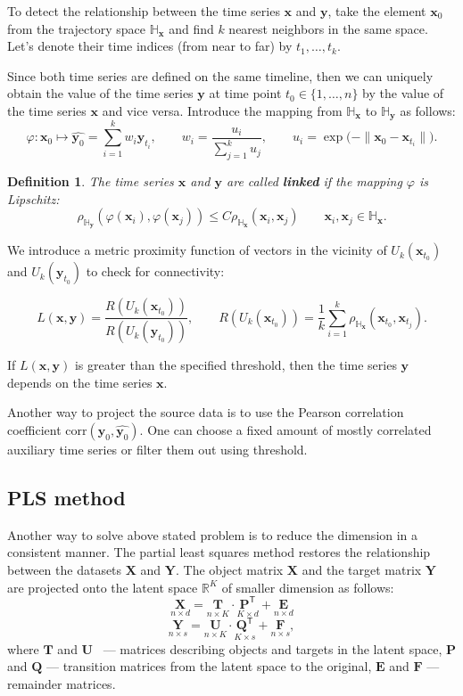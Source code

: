 \documentclass[bst/sn-mathphys]{sn-jnl}%
\newcommand{\bx}{\ensuremath{\mathbf{x}}}
\newcommand{\by}{\mathbf{y}}
\newcommand{\bT}{\mathbf{T}}
\newcommand{\bX}{\mathbf{X}}
\newcommand{\bY}{\mathbf{Y}}
\newcommand{\bU}{\mathbf{U}}
\newcommand{\bQ}{\mathbf{Q}}
\newcommand{\bP}{\mathbf{P}}
\newcommand{\bE}{\mathbf{E}}
\newcommand{\bF}{\mathbf{F}}
\newcommand{\dH}{\mathbb{H}}
\newcommand{\dR}{\mathbb{R}}
\renewcommand{\T}{^{\mathsf{T}}}
\theoremstyle{thmstyleone}%
\theoremstyle{thmstyletwo}%
\theoremstyle{thmstylethree}%
\newtheorem{definition}{Definition}%
\begin{document}
To detect the relationship between the time series $\bx$ and $\by$, take the element $\bx_0$ from the trajectory space $\dH_{\bx}$ and find $k$ nearest neighbors in the same space. 
Let's denote their time indices (from near to far) by $t_1, \ldots, t_k$.

Since both time series are defined on the same timeline, then we can uniquely obtain the value of the time series $\by$ at time point $t_0 \in \{1, \ldots, n\}$ by the value of the time series $\bx$ and vice versa.
Introduce the mapping from $\dH_{\bx}$ to $\dH_{\by}$ as follows:
$$ \varphi: \bx_0 \mapsto \widehat{\by_0} = \sum\limits_{i=1}^k w_i \by_{t_i}, \qquad 
w_i = \dfrac{u_i}{\sum\limits_{j=1}^k u_j}, \qquad
u_i = \exp \bigl( - \| \bx_0 - \bx_{t_i} \| \bigr).$$

\begin{definition}
	The time series $\bx$ and $\by$ are called \textbf{linked} if the mapping $\varphi$ is Lipschitz:
	$$\rho_{\dH_{\by}}(\varphi(\bx_i), \varphi(\bx_j)) \leq C \rho_{\dH_{\bx}}(\bx_i, \bx_j) \qquad \bx_i, \bx_j \in \dH_{\bx}. $$
\end{definition}

We introduce a metric proximity function of vectors in the vicinity of $U_k(\bx_{t_0})$ and $U_k(\by_{t_0})$ to check for connectivity:

\begin{equation}
	L(\bx, \by) = \dfrac{R(U_k(\bx_{t_0}))}{R(U_k(\by_{t_0}))}, \qquad R(U_k(\bx_{t_0})) = \dfrac{1}{k} \sum\limits_{i=1}^k \rho_{\dH_{\bx}}(\bx_{t_0}, \bx_{t_j}).
\end{equation}

If $L(\bx,\by)$ is greater than the specified threshold, then the time series $\by$ depends on the time series $\bx$.

Another way to project the source data is to use the Pearson correlation coefficient $\text{corr}(\by_0, \widehat{\by_0})$. 
One can choose a fixed amount of mostly correlated auxiliary time series or filter them out using threshold.

\subsection{PLS method}
Another way to solve above stated problem is to reduce the dimension in a consistent manner.
The partial least squares method restores the relationship between the datasets $\bX$ and $\bY$.
The object matrix $\bX$ and the target matrix $\bY$ are projected onto the latent space $\dR^K$ of smaller dimension as follows:
$$ \underset{n \times d}{\bX} = \underset{n \times K}{\bT} \cdot \underset{K \times d}{\bP\T} + \underset{n \times d}{\bE} $$
$$ \underset{n \times s}{\bY} = \underset{n \times K}{\bU} \cdot \underset{K \times s}{\bQ\T} + \underset{n \times s}{\bF}, $$
where $\bT$ and $\bU$ ~--- matrices describing objects and targets in the latent space, $\bP$ and $\bQ$ --- transition matrices from the latent space to the original, $\bE$ and $\bF$ --- remainder matrices.
\end{document}
